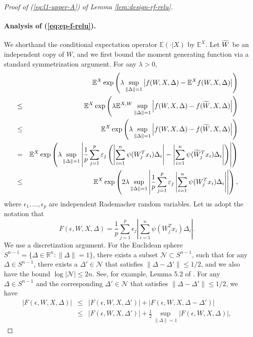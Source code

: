 \begin{proof}[Proof of (\ref{eq:l1-upper-A}) of Lemma \ref{lem:design-rf-relu}]
\paragraph{Analysis of (\ref{eq:ep-f-relu}).} We shorthand the conditional expectation operator $\mathbb{E}(\cdot|X)$ by $\mathbb{E}^X$. Let $\widetilde{W}$ be an independent copy of $W$, and we first bound the moment generating function via a standard symmetrization argument. For any $\lambda>0$,
\begin{eqnarray}
\nonumber && \mathbb{E}^X\exp\left(\lambda \sup_{\|\Delta\|=1}\left|f(W,X,\Delta)-\mathbb{E}^Xf(W,X,\Delta)\right|\right) \\
\nonumber &\leq& \mathbb{E}^X\exp\left(\lambda \mathbb{E}^{X,W}\sup_{\|\Delta\|=1}\left|f(W,X,\Delta)-f(\wt{W},X,\Delta)\right|\right) \\
\nonumber &\leq& \mathbb{E}^X\exp\left(\lambda \sup_{\|\Delta\|=1}\left|f(W,X,\Delta)-f(\wt{W},X,\Delta)\right|\right) \\
\nonumber &=& \mathbb{E}^X\exp\left(\lambda\sup_{\|\Delta\|=1}\left|\frac{1}{p}\sum_{j=1}^p\epsilon_j\left(\left|\sum_{i=1}^n\psi(W_j^Tx_i)\Delta_i\right|-\left|\sum_{i=1}^n\psi(\wt{W}_j^Tx_i)\Delta_i\right|\right)\right|\right) \\
\label{eq:mgf-b-relu} &\leq& \mathbb{E}^X\exp\left(2\lambda\sup_{\|\Delta\|=1}\left|\frac{1}{p}\sum_{j=1}^p\epsilon_j\left|\sum_{i=1}^n\psi(W_j^Tx_i)\Delta_i\right|\right|\right),
\end{eqnarray}
where $\epsilon_1,...,\epsilon_p$ are independent Rademacher random variables. Let us adopt the notation that
$$F(\epsilon,W,X,\Delta)=\frac{1}{p}\sum_{j=1}^p\epsilon_j\left|\sum_{i=1}^n\psi(W_j^Tx_i)\Delta_i\right|.$$
We use a discretization argument. For the Euclidean sphere $S^{n-1}=\{\Delta\in\mathbb{R}^n: \|\Delta\|=1\}$, there exists a subset $\mathcal{N}\subset S^{n-1}$, such that for any $\Delta\in S^{n-1}$, there exists a $\Delta'\in\mathcal{N}$ that satisfies $\|\Delta-\Delta'\|\leq 1/2$, and we also have the bound $\log|\mathcal{N}|\leq 2n$. See, for example, Lemma 5.2 of \cite{vershynin2010introduction}.
For any $\Delta\in S^{n-1}$ and the corresponding $\Delta'\in\mathcal{N}$ that satisfies $\|\Delta-\Delta'\|\leq 1/2$, we have
\begin{eqnarray*}
|F(\epsilon,W,X,\Delta)| &\leq& |F(\epsilon,W,X,\Delta')| + |F(\epsilon,W,X,\Delta-\Delta')| \\
&\leq& |F(\epsilon,W,X,\Delta')| + \frac{1}{2}\sup_{\|\Delta\|=1}|F(\epsilon,W,X,\Delta)|,
\end{eqnarray*}

\end{proof}
